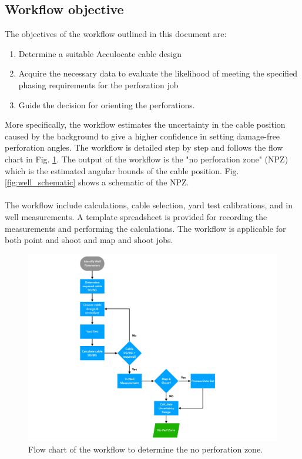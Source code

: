 \documentclass[paper=a4, fontsize=11pt]{scrartcl}
\numberwithin{equation}{section}		%
\numberwithin{figure}{section}			%
\numberwithin{table}{section}				%
\begin{document}
\subsection{Workflow objective}
The objectives of the workflow outlined in this document are:
\begin{enumerate}
    \item Determine a suitable Acculocate cable design
    \item Acquire the necessary data to evaluate the likelihood of meeting the specified phasing requirements for the perforation job
    \item Guide the decision for orienting the perforations.
\end{enumerate}
More specifically, the workflow estimates the uncertainty in the cable position caused by the background to give a higher confidence in setting damage-free perforation angles.  The workflow is detailed step by step and follows the flow chart in Fig. \ref{fig:flowchart}.  The output of the workflow is the "no perforation zone" (NPZ) which is the estimated angular bounds of the cable position.  Fig. \ref{fig:well_schematic} shows a schematic of the NPZ.

\paragraph{}
The workflow include calculations, cable selection, yard test calibrations, and in well measurements.  A template spreadsheet is provided for recording the measurements and performing the calculations.  The workflow is applicable for both point and shoot and map and shoot jobs.      

\begin{figure}[h!]
    \caption{Flow chart of the workflow to determine the no perforation zone.}
    \label{fig:flowchart}
    \centering
    \includegraphics[width=1.0\textwidth]{figures/flow_chart.pdf}
\end{figure}
\end{document}
